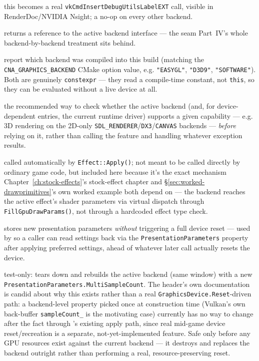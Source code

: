 \begin{description}
  this becomes a real \texttt{vkCmdInsertDebugUtilsLabelEXT} call, visible in RenderDoc/NVIDIA
  Nsight; a no-op on every other backend.
\item[\texttt{IGraphicsBackend\& GetBackend() const}] returns a reference to the active backend
  interface --- the seam Part~IV's whole backend-by-backend treatment sits behind.
\item[\texttt{constexpr CNA::GraphicsBackendType GetGraphicsBackendType() const} /
  \texttt{constexpr std::string\_view GetGraphicsBackendName() const}] report which backend was
  compiled into this build (matching the \texttt{CNA\_GRAPHICS\_BACKEND} CMake option value,
  e.g. \texttt{"EASYGL"}, \texttt{"D3D9"}, \texttt{"SOFTWARE"}). Both are genuinely
  \texttt{constexpr} --- they read a compile-time constant, not \texttt{this}, so they can be
  evaluated without a live device at all.
\item[\texttt{bool SupportsCapability(CNA::GraphicsCapability capability) const}] the
  recommended way to check whether the active backend (and, for device-dependent entries, the
  current runtime driver) supports a given capability --- e.g. 3D rendering on the 2D-only
  \texttt{SDL\_RENDERER}/\texttt{DX3}/\texttt{CANVAS} backends --- \emph{before} relying on it,
  rather than calling the feature and handling whatever exception results.
\item[\texttt{void SetCurrentEffect(Effect* effect)}] called automatically by
  \texttt{Effect::Apply()}; not meant to be called directly by ordinary game code, but included
  here because it's the exact mechanism Chapter~\ref{ch:stock-effects}'s stock-effect chapter
  and \S\ref{sec:worked-drawprimitives}'s own worked example both depend on --- the backend
  reaches the active effect's shader parameters via virtual dispatch through
  \texttt{FillGpuDrawParams()}, not through a hardcoded effect type check.
\item[\texttt{void SetPresentationParameters(const PresentationParameters\& pp)}] stores new
  presentation parameters \emph{without} triggering a full device reset --- used by
   so a caller can read settings back via the
  \texttt{PresentationParameters} property after applying preferred settings, ahead of whatever
  later call actually resets the device.
\item[\texttt{void RecreateBackendForMultiSampleCount(int multiSampleCount)}] test-only: tears
  down and rebuilds the active backend (same window) with a new
  \texttt{PresentationParameters.MultiSampleCount}. The header's own documentation is candid
  about why this exists rather than a real \texttt{GraphicsDevice.Reset}-driven path: a
  backend-level property picked once at construction time (Vulkan's own back-buffer
  \texttt{sampleCount\_} is the motivating case) currently has no way to change after the fact
  through 's existing apply path, since real mid-game device
  reset/recreation is a separate, not-yet-implemented feature. Safe only before any GPU
  resources exist against the current backend --- it destroys and replaces the backend outright
  rather than performing a real, resource-preserving reset.
\end{description}

